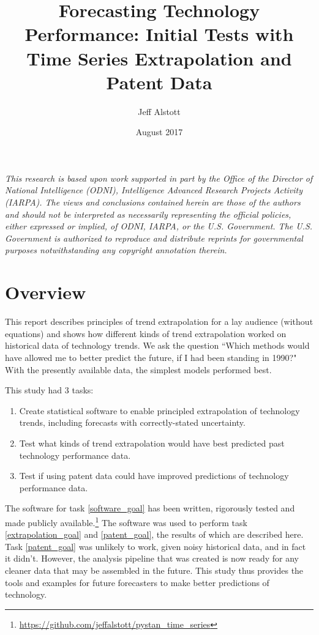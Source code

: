 \documentclass{article}
\title{Forecasting Technology Performance: Initial Tests with Time Series Extrapolation and Patent Data}
\author{Jeff Alstott}
\date{August 2017}
\begin{document}
\maketitle

\textit{This research is based upon work supported in part by the Office of the Director of National Intelligence (ODNI), Intelligence Advanced Research Projects Activity (IARPA). The views and conclusions contained herein are those of the authors and should not be interpreted as necessarily representing the official policies, either expressed or implied, of ODNI, IARPA, or the U.S. Government. The U.S. Government is authorized to reproduce and distribute reprints for governmental purposes notwithstanding any copyright annotation therein.}

\pagebreak

\tableofcontents

\section{Overview}
This report describes principles of trend extrapolation for a lay audience (without equations) and shows how different kinds of trend extrapolation worked on historical data of technology trends. We ask the question ``Which methods would have allowed me to better predict the future, if I had been standing in 1990?" With the presently available data, the simplest models performed best.

This study had 3 tasks:
\begin{enumerate}
    \item Create statistical software to enable principled extrapolation of technology trends, including forecasts with correctly-stated uncertainty\label{software_goal}.
    \item Test what kinds of trend extrapolation would have best predicted past technology performance data\label{extrapolation_goal}.
    \item Test if using patent data could have improved predictions of technology performance data\label{patent_goal}.
\end{enumerate}

The software for task \ref{software_goal} has been written, rigorously tested and made publicly available.\footnote{\url{https://github.com/jeffalstott/pystan_time_series}} The software was used to perform task \ref{extrapolation_goal} and \ref{patent_goal}, the results of which are described here. Task \ref{patent_goal} was unlikely to work, given noisy historical data, and in fact it didn't. However, the analysis pipeline that was created is now ready for any cleaner data that may be assembled in the future. This study thus provides the tools and examples for future forecasters to make better predictions of technology.
\end{document}
